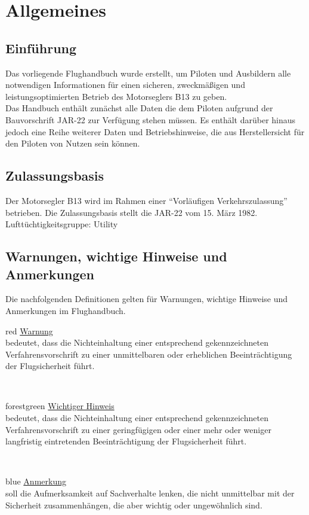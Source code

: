 \chapter{ Allgemeines}
\section{Einführung}
Das vorliegende Flughandbuch wurde erstellt, um Piloten und Ausbildern alle notwendigen Informationen für einen sicheren, zweckmäßigen und leistungsoptimierten Betrieb des Motorseglers B13 zu geben.\\
\newline
Das Handbuch enthält zunächst alle Daten die dem Piloten aufgrund der Bauvorschrift JAR-22 zur Verfügung stehen müssen. Es enthält darüber hinaus jedoch eine Reihe weiterer Daten und Betriebshinweise, die aus Herstellersicht für den Piloten von Nutzen sein können.

\section{Zulassungsbasis}
Der Motorsegler B13 wird im Rahmen einer "`Vorläufigen Verkehrszulassung"' betrieben. Die Zulassungsbasis stellt die JAR-22 vom 15. März 1982.\\
\newline
Lufttüchtigkeitsgruppe: Utility
\newpage
\section{Warnungen, wichtige Hinweise und Anmerkungen}
Die nachfolgenden Definitionen gelten für Warnungen, wichtige Hinweise und
Anmerkungen im Flughandbuch.\\
\newline
\newline
\begin{color}{red}
\large{\underline{Warnung}}\\
bedeutet, dass die Nichteinhaltung einer entsprechend gekennzeichneten Verfahrensvorschrift zu einer unmittelbaren oder erheblichen Beeinträchtigung der Flugsicherheit führt.
\end{color}\\
\newline
\begin{color}{forestgreen}
\large{\underline{Wichtiger Hinweis}}\\
bedeutet, dass die Nichteinhaltung einer entsprechend gekennzeichneten Verfahrensvorschrift zu einer geringfügigen oder einer mehr oder weniger langfristig eintretenden Beeinträchtigung der Flugsicherheit führt.
\end{color}\\
\newline
\begin{color}{blue}
\large{\underline{Anmerkung}}\\
soll die Aufmerksamkeit auf Sachverhalte lenken, die nicht unmittelbar mit der Sicherheit zusammenhängen, die aber wichtig oder ungewöhnlich sind.
\end{color}

